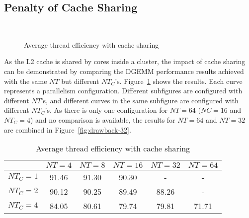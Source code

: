 \subsection{Penalty of Cache Sharing}\label{subsec:drawback}

\begin{figure}
  \centering
  \\
  \caption{Average thread efficiency with cache sharing}
  \label{fig:drawback}
\end{figure}

As the L2 cache is shared by cores inside a cluster,
the impact of cache sharing can be demonstrated
by comparing the DGEMM performance results achieved
with the same $NT$
but different $NT_C$'s.
Figure~\ref{fig:drawback} shows the results.
Each curve represents a parallelism configuration.
Different subfigures are configured with different $NT$'s,
and different curves in the same subfigure are
configured with different $NT_C$'s.
As there is only one configuration for $NT=64$ ($NC=16$ and $NT_C=4$)
and no comparison is available,
the results for $NT=64$ and $NT=32$ are combined in Figure~\ref{fig:drawback-32}.

\begin{table}
  \centering
  \caption{Average thread efficiency with cache sharing}
  \label{tab:drawback}
  \begin{tabular}{cccccc}
    \toprule
     & $NT=4$ & $NT=8$ & $NT=16$ & $NT=32$ & $NT=64$ \\
    \midrule
    $NT_C=1$ & 91.46 & 91.30 & 90.30 & -     & - \\   
    $NT_C=2$ & 90.12 & 90.25 & 89.49 & 88.26 & - \\
    $NT_C=4$ & 84.05 & 80.61 & 79.74 & 79.81 & 71.71 \\
    \bottomrule
  \end{tabular}
\end{table}

